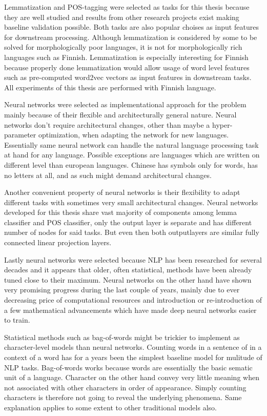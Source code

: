\documentclass[12pt,a4paper,english
]{tutthesis}
\begin{document}
Lemmatization and POS-tagging were selected as tasks for this thesis because they are well studied and results from other research projects exist making baseline validation possible. Both tasks are also popular choises as input features for downstream processing. Although lemmatization is considered by some to be solved for morphologically poor languages, it is not for morphologically rich languages such as Finnish. Lemmatization is especially interesting for Finnish because properly done lemmatization would allow usage of word level features such as pre-computed word2vec vectors as input features in downstream tasks. All experiments of this thesis are performed with Finnish language.

Neural networks were selected as implementational approach for the problem mainly because of their flexible and architecturally general nature. Neural networks don't require architectural changes, other than maybe a hyper-parameter optimization, when adapting the network for new languages. Essentially same neural network can handle the natural language processing task at hand for any language. Possible exceptions are languages which are written on different level than european languages. Chinese has symbols only for words, has no letters at all, and as such might demand architectural changes.

Another convenient property of neural networks is their flexibility to adapt different tasks with sometimes very small architectural changes. Neural networks developed for this thesis share vast majority of components among lemma classifier and POS classifier, only the output layer is separate and has different number of nodes for said tasks. But even then both outputlayers are similar fully connected linear projection layers.

Lastly neural networks were selected because NLP has been researched for several decades and it appears that older, often statistical, methods have been already tuned close to their maximum. Neural networks on the other hand have shown very promising progress during the last couple of years, mainly due to ever decreasing price of computational resources and introduction or re-introduction of a few mathematical advancements which have made deep neural networks easier to train. 

Statistical methods such as bag-of-words might be trickier to implement as character-level models than neural networks. Counting words in a sentence of in a context of a word has for a years been the simplest baseline model for mulitude of NLP tasks. Bag-of-words works because words are essentially the basic sematic unit of a language. Character on the other hand convey very little meaning when not associated with other characters in order of appearance. Simply counting characters is therefore not going to reveal the underlying phenomena. Same explanation applies to some extent to other traditional models also.
\end{document}
